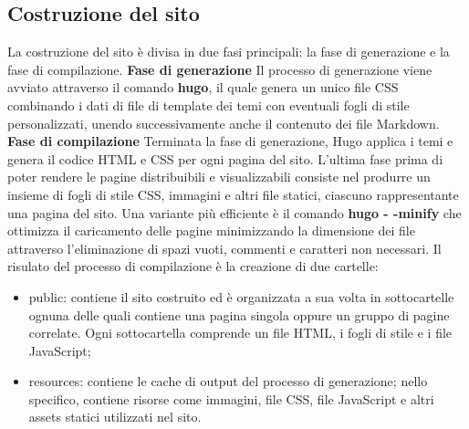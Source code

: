 \documentclass[target=bach,aauheader=]{thud}
\begin{document}
\subsection{Costruzione del sito}
La costruzione del sito è divisa in due fasi principali: la fase di generazione e la fase di compilazione.
\newline
\newline
\textbf{{\fontsize{12}{14}\selectfont Fase di generazione}}
\newline \newline
Il processo di generazione viene avviato attraverso il comando \textbf{hugo}, il quale genera un unico file CSS combinando i dati di file di template dei temi con eventuali fogli di stile personalizzati, unendo successivamente anche il contenuto dei file Markdown.
\newline \newline
\textbf{{\fontsize{12}{14}\selectfont Fase di compilazione}}
\newline \newline
Terminata la fase di generazione, Hugo applica i temi e genera il codice HTML e CSS per ogni pagina del sito. L'ultima fase prima di poter rendere le pagine distribuibili e visualizzabili consiste nel produrre un insieme di fogli di stile CSS, immagini e
altri file statici, ciascuno rappresentante una pagina del sito. 
Una variante più efficiente è il comando \textbf{hugo - -minify} che ottimizza il caricamento delle pagine minimizzando la dimensione dei file attraverso l'eliminazione di spazi vuoti, commenti e caratteri non necessari.
\newline
Il risulato del processo di compilazione è la creazione di due cartelle:
\begin{itemize}
    \item public: contiene il sito costruito ed è organizzata a sua volta in sottocartelle ognuna delle quali contiene una pagina singola oppure un gruppo di pagine correlate. Ogni sottocartella comprende un file HTML, i fogli di stile e i file JavaScript;
    \item resources: contiene le cache di output del processo di generazione; nello specifico, contiene risorse come immagini, file CSS, file JavaScript e altri assets statici utilizzati nel sito.
\end{itemize}
\end{document}
